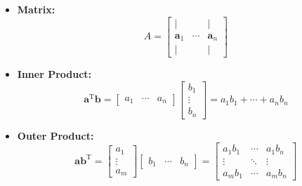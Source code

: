 \documentclass{article}
\begin{document}
\begin{itemize}

    \item \textbf{Matrix:}
    \begin{equation}
        A =
        \left[
            \begin{array}{ccc}
                | &        & | \\
                \mathbf{a}_1 & \cdots & \mathbf{a}_n \\
                | &        & |
            \end{array}
        \right]
        \label{eq:matrix}
    \end{equation}

    \item \textbf{Inner Product:}
    \begin{equation}
        \mathbf{a}^{\mathrm{T}} \mathbf{b} =
        \left[
            \begin{array}{ccc}
                a_1 & \cdots & a_n
            \end{array}
        \right]
        \left[
            \begin{array}{c}
                b_1 \\
                \vdots \\
                b_n
            \end{array}
        \right]
        = a_1 b_1 + \cdots + a_n b_n
        \label{eq:innerprod}
    \end{equation}

    \item \textbf{Outer Product:}
    \begin{equation}
        \mathbf{a} \mathbf{b}^{\mathrm{T}} =
        \left[
            \begin{array}{c}
                a_1 \\
                \vdots \\
                a_m
            \end{array}
        \right]
        \left[
            \begin{array}{ccc}
                b_1 & \cdots & b_n
            \end{array}
        \right]
        =
        \left[
            \begin{array}{ccc}
                a_1 b_1 & \cdots & a_1 b_n \\
                \vdots & \ddots & \vdots \\
                a_m b_1 & \cdots & a_m b_n
            \end{array}
        \right]
        \label{eq:outerprod}
    \end{equation}



\end{itemize}
\end{document}
